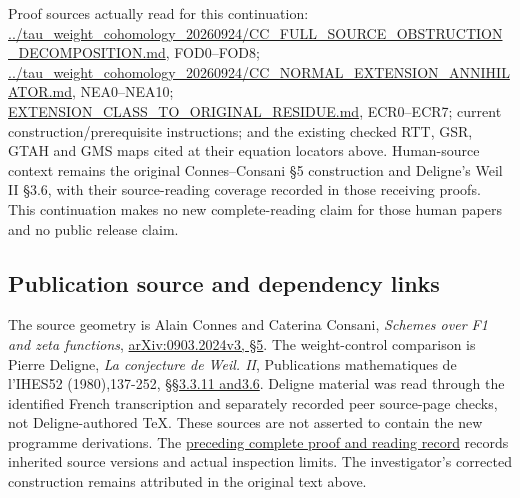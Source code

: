 Proof sources actually read for this continuation:
\href{https://github.com/KokunoYumeto/zeta-function-research-reader/blob/36a82ecca98addb8a98b48204e349737856c7223/workbenches/splitzero-tandem/continuations/20260924-cohomology-weight-and-character-lifts/gct-weight-control/proofs/CC_FULL_SOURCE_OBSTRUCTION_DECOMPOSITION.md}{../tau\_weight\_cohomology\_20260924/CC\_FULL\_SOURCE\_OBSTRUCTION\_DECOMPOSITION.md},
FOD0--FOD8;
\href{https://github.com/KokunoYumeto/zeta-function-research-reader/blob/36a82ecca98addb8a98b48204e349737856c7223/workbenches/splitzero-tandem/continuations/20260924-cohomology-weight-and-character-lifts/gct-weight-control/proofs/CC_NORMAL_EXTENSION_ANNIHILATOR.md}{../tau\_weight\_cohomology\_20260924/CC\_NORMAL\_EXTENSION\_ANNIHILATOR.md},
NEA0--NEA10;
\href{https://github.com/KokunoYumeto/zeta-function-research-reader/blob/main/workbenches/splitzero-tandem/continuations/20260925-full-source-tensor-and-original-divisor/gct/EXTENSION_CLASS_TO_ORIGINAL_RESIDUE.md}{EXTENSION\_CLASS\_TO\_ORIGINAL\_RESIDUE.md},
ECR0--ECR7; current construction/prerequisite instructions; and the
existing checked RTT, GSR, GTAH and GMS maps cited at their equation
locators above. Human-source context remains the original
Connes--Consani §5 construction and Deligne's Weil II §3.6, with their
source-reading coverage recorded in those receiving proofs. This
continuation makes no new complete-reading claim for those human papers
and no public release claim.

\subsection{Publication source and dependency
links}\label{publication-source-and-dependency-links}

The source geometry is Alain Connes and Caterina Consani, \emph{Schemes
over F1 and zeta functions},
\href{https://arxiv.org/abs/0903.2024v3}{arXiv:0903.2024v3, §5}. The
weight-control comparison is Pierre Deligne, \emph{La conjecture de
Weil. II}, Publications mathematiques de l'IHES52 (1980),137-252,
\href{https://www.numdam.org/item/PMIHES_1980__52__137_0/}{§§3.3.11
and3.6}. Deligne material was read through the identified French
transcription and separately recorded peer source-page checks, not
Deligne-authored TeX. These sources are not asserted to contain the new
programme derivations. The
\href{https://github.com/KokunoYumeto/zeta-function-research-reader/blob/36a82ecca98addb8a98b48204e349737856c7223/workbenches/splitzero-tandem/continuations/20260924-cohomology-weight-and-character-lifts/BUILD_AND_REVIEW.md}{preceding
complete proof and reading record} records inherited source versions and
actual inspection limits. The investigator's corrected construction
remains attributed in the original text above.
